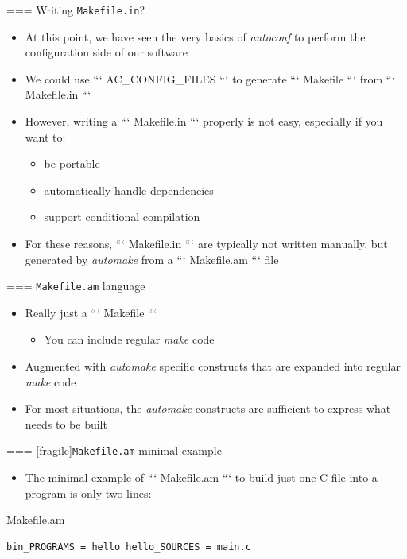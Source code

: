 === {Writing {\tt Makefile.in}?}
  \begin{itemize}
  \item At this point, we have seen the very basics of {\em autoconf}
    to perform the configuration side of our software
  \item We could use ``` AC_CONFIG_FILES ``` to generate
    ``` Makefile ``` from ``` Makefile.in ```
  \item However, writing a ``` Makefile.in ``` properly is not easy,
    especially if you want to:
    \begin{itemize}
    \item be portable
    \item automatically handle dependencies
    \item support conditional compilation
    \end{itemize}
  \item For these reasons, ``` Makefile.in ``` are typically not
    written manually, but generated by {\em automake} from a
    ``` Makefile.am ``` file
  \end{itemize}


=== {{\tt Makefile.am} language}
  \begin{itemize}
  \item Really just a ``` Makefile ```
    \begin{itemize}
    \item You can include regular {\em make} code
    \end{itemize}
  \item Augmented with {\em automake} specific constructs that are
    expanded into regular {\em make} code
  \item For most situations, the {\em automake} constructs are
    sufficient to express what needs to be built
  \end{itemize}


=== [fragile]{{\tt Makefile.am} minimal example}

  \begin{itemize}
  \item The minimal example of ``` Makefile.am ``` to build just one C
    file into a program is only two lines:
  \end{itemize}

  \begin{block}{Makefile.am}
\begin{verbatim}
bin_PROGRAMS = hello hello_SOURCES = main.c
\end{verbatim}
  \end{block}

